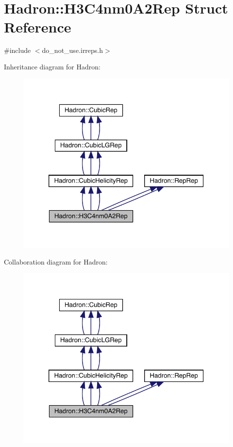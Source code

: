\hypertarget{structHadron_1_1H3C4nm0A2Rep}{}\section{Hadron\+:\+:H3\+C4nm0\+A2\+Rep Struct Reference}
\label{structHadron_1_1H3C4nm0A2Rep}


{\ttfamily \#include $<$do\+\_\+not\+\_\+use.\+irreps.\+h$>$}



Inheritance diagram for Hadron\+:
\nopagebreak
\begin{figure}[H]
\begin{center}
\leavevmode
\includegraphics[width=320pt]{dd/d5b/structHadron_1_1H3C4nm0A2Rep__inherit__graph}
\end{center}
\end{figure}


Collaboration diagram for Hadron\+:
\nopagebreak
\begin{figure}[H]
\begin{center}
\leavevmode
\includegraphics[width=320pt]{da/d1a/structHadron_1_1H3C4nm0A2Rep__coll__graph}
\end{center}
\end{figure}
